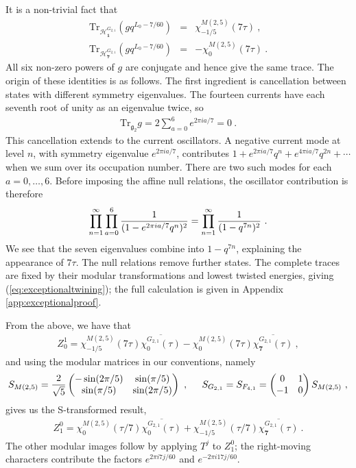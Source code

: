 \documentclass[12pt]{article}
\numberwithin{equation}{section}
\newcommand{\bea}{\begin{eqnarray}}
\newcommand{\eea}{\end{eqnarray}}
\def\no{\nonumber}
\newcommand{\Tr}{\mathrm{Tr}}
\theoremstyle{remark}
\begin{document}
It is a non-trivial fact that 
\bea \label{eq:exceptionaltwining}
\Tr_{\mathcal H^{G_{2,1}}_{\mathbf1}}\left(gq^{L_0-7/60}\right)&=&\chi^{M(2,5)}_{-1/5}(7\tau)~,\no\\
\Tr_{\mathcal H^{G_{2,1}}_{\mathbf7}}\left(gq^{L_0-7/60}\right)&=&-\chi^{M(2,5)}_0(7\tau)~.
\eea
All six non-zero powers of $g$ are conjugate and hence give the same trace.
The origin of these identities is as follows. The first ingredient is cancellation between states with different symmetry eigenvalues. The fourteen currents have each seventh root of unity as an eigenvalue twice, so
\bea
\Tr_{\mathfrak g_2}g=2\sum_{a=0}^6e^{2\pi ia/7}=0~.
\eea
This cancellation extends to the current oscillators. A negative current mode at level $n$, with symmetry eigenvalue $e^{2\pi ia/7}$, contributes $1+e^{2\pi ia/7}q^n+e^{4\pi ia/7}q^{2n}+\cdots$ when we sum over its occupation number. There are two such modes for each $a=0,\ldots,6$. Before imposing the affine null relations, the oscillator contribution is therefore
\bea
\prod_{n=1}^{\infty}\prod_{a=0}^{6}{1\over(1-e^{2\pi ia/7}q^n)^2}=\prod_{n=1}^{\infty}{1\over(1-q^{7n})^2}~.
\eea
We see that the seven eigenvalues combine into $1-q^{7n}$, explaining the appearance of $7\tau$. The null relations remove further states. The complete traces are fixed by their modular transformations and lowest twisted energies, giving (\ref{eq:exceptionaltwining}); the full calculation is given in Appendix \ref{app:exceptionalproof}.

From the above, we have that 
\bea
Z^1_0=\chi^{M(2,5)}_{-1/5}(7\tau)\overline{\chi^{G_{2,1}}_0(\tau)}-\chi^{M(2,5)}_0(7\tau)\overline{\chi^{G_{2,1}}_{\mathbf7}(\tau)}~,
\eea
and using the modular matrices in our conventions, namely
\bea 
\label{eq:G2F4Smatrix}
S_{M(2,5)}={2\over \sqrt5}\begin{pmatrix}-\sin(2\pi/5)&\sin(\pi/5)\\\sin(\pi/5)&\sin(2\pi/5)\end{pmatrix}~,
\hspace{0.2 in}
S_{G_{2,1}}=S_{F_{4,1}}=\begin{pmatrix}0&1\\-1&0\end{pmatrix}S_{M(2,5)}~,
\eea
gives us the S-transformed result,
\bea
Z^0_1=\chi^{M(2,5)}_0(\tau/7)\overline{\chi^{G_{2,1}}_0(\tau)}+\chi^{M(2,5)}_{-1/5}(\tau/7)\overline{\chi^{G_{2,1}}_{\mathbf7}(\tau)}~.
\eea
The other modular images follow by applying $T^j$ to $Z^0_1$; the right-moving characters contribute the factors $e^{2\pi i7j/60}$ and $e^{-2\pi i17j/60}$.
\end{document}
